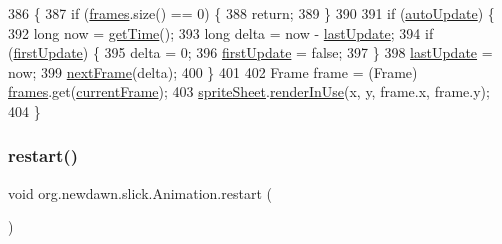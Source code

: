 \begin{DoxyCode}
386                                          \{
387        \textcolor{keywordflow}{if} (\mbox{\hyperlink{classorg_1_1newdawn_1_1slick_1_1_animation_a39f0c6a16e479985b22f7dd3bb781bf7}{frames}}.size() == 0) \{
388           \textcolor{keywordflow}{return};
389        \}
390        
391        \textcolor{keywordflow}{if} (\mbox{\hyperlink{classorg_1_1newdawn_1_1slick_1_1_animation_a343dbff14a050cf8753e9a67746deede}{autoUpdate}}) \{
392           \textcolor{keywordtype}{long} now = \mbox{\hyperlink{classorg_1_1newdawn_1_1slick_1_1_animation_ad5d5822b4aa1ac0ed36fdb06d8c3a9c5}{getTime}}();
393           \textcolor{keywordtype}{long} delta = now - \mbox{\hyperlink{classorg_1_1newdawn_1_1slick_1_1_animation_a5f6bf06ad6ea524d644858261b221794}{lastUpdate}};
394           \textcolor{keywordflow}{if} (\mbox{\hyperlink{classorg_1_1newdawn_1_1slick_1_1_animation_a1ddf04d31c943c41b82efbd1f2179d77}{firstUpdate}}) \{
395              delta = 0;
396              \mbox{\hyperlink{classorg_1_1newdawn_1_1slick_1_1_animation_a1ddf04d31c943c41b82efbd1f2179d77}{firstUpdate}} = \textcolor{keyword}{false};
397           \}
398           \mbox{\hyperlink{classorg_1_1newdawn_1_1slick_1_1_animation_a5f6bf06ad6ea524d644858261b221794}{lastUpdate}} = now;
399           \mbox{\hyperlink{classorg_1_1newdawn_1_1slick_1_1_animation_ae23662cd09dfe23e566c45b9bf85d97a}{nextFrame}}(delta);
400        \}
401        
402        Frame frame = (Frame) \mbox{\hyperlink{classorg_1_1newdawn_1_1slick_1_1_animation_a39f0c6a16e479985b22f7dd3bb781bf7}{frames}}.get(\mbox{\hyperlink{classorg_1_1newdawn_1_1slick_1_1_animation_a358e1f2b9d9a05f83a416405e6bcd332}{currentFrame}});
403        \mbox{\hyperlink{classorg_1_1newdawn_1_1slick_1_1_animation_ad353dea56461398b73362f581b7efb7d}{spriteSheet}}.\mbox{\hyperlink{classorg_1_1newdawn_1_1slick_1_1_sprite_sheet_a6f8fd3a1353fa726828d331088902dd4}{renderInUse}}(x, y, frame.x, frame.y);
404     \} 
\end{DoxyCode}
\mbox{\label{classorg_1_1newdawn_1_1slick_1_1_animation_a75484f44d2032efcf9f14dd303e35139}} 
\subsubsection{\texorpdfstring{restart()}{restart()}}
{\footnotesize\ttfamily void org.\+newdawn.\+slick.\+Animation.\+restart (\begin{DoxyParamCaption}{ }\end{DoxyParamCaption})\hspace{0.3cm}{\ttfamily [inline]}}

